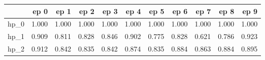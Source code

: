 \begin{tabular}{lrrrrrrrrrr}
\toprule
{} &   ep 0 &   ep 1 &   ep 2 &   ep 3 &   ep 4 &   ep 5 &   ep 6 &   ep 7 &   ep 8 &   ep 9 \\
\midrule
hp\_0 &  1.000 &  1.000 &  1.000 &  1.000 &  1.000 &  1.000 &  1.000 &  1.000 &  1.000 &  1.000 \\
hp\_1 &  0.909 &  0.811 &  0.828 &  0.846 &  0.902 &  0.775 &  0.828 &  0.621 &  0.786 &  0.923 \\
hp\_2 &  0.912 &  0.842 &  0.835 &  0.842 &  0.874 &  0.835 &  0.884 &  0.863 &  0.884 &  0.895 \\
\bottomrule
\end{tabular}
